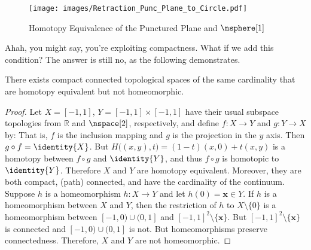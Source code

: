 \documentclass{book}                                                           %
\begin{document}
                \begin{figure}
                    \centering
                    \captionsetup{type=figure}
                    \texttt{[image: images/Retraction\_Punc\_Plane\_to\_Circle.pdf]}
                    \caption{%
                        Homotopy Equivalence of the Punctured Plane and
                        $\nsphere[1]$%
                    }
                    \label{fig:HE_punc_plane_and_circle}
                \end{figure}
                Ahah, you might say, you're exploiting compactness. What if we
                add this condition? The answer is still no, as the following
                demonstrates.
                \begin{theorem}
                    There exists compact connected topological spaces of the
                    same cardinality that are homotopy equivalent but not
                    homeomorphic.
                \end{theorem}
                \begin{proof}
                    Let $X=[\minus{1},1]$, $Y=[\minus{1},1]\times[\minus{1},1]$
                    have their usual subspace topologies from $\mathbb{R}$ and
                    $\nspace[2]$, respectively, and define $f:X\rightarrow{Y}$
                    and $g:Y\rightarrow{X}$ by:
                    That is, $f$ is the inclusion mapping and $g$ is the
                    projection in the $y$ axis. Then $g\circ{f}=\identity{X}$.
                    But $H\big((x,y),t\big)=(1-t)(x,0)+t(x,y)$ is a homotopy
                    between $f\circ{g}$ and $\identity{Y}$, and thus
                    $f\circ{g}$ is homotopic to $\identity{Y}$. Therefore $X$
                    and $Y$ are homotopy equivalent. Moreover, they are both
                    compact, (path) connected, and have the cardinality
                    of the continuum. Suppose $h$ is a homeomorphism
                    $h:X\rightarrow{Y}$ and let $h(0)=\mathbf{x}\in{Y}$. If $h$
                    is a homeomorphism between $X$ and $Y$, then the restriction
                    of $h$ to $X\setminus\{0\}$ is a homeomorphism between
                    $[-1,0)\cup(0,1]$ and $[-1,1]^{2}\setminus\{\mathbf{x}\}$.
                    But $[-1,1]^{2}\setminus\{\mathbf{x}\}$ is connected and
                    $[-1,0)\cup(0,1]$ is not. But homeomorphisms preserve
                    connectedness. Therefore, $X$ and $Y$ are not homeomorphic.
                \end{proof}
\end{document}
